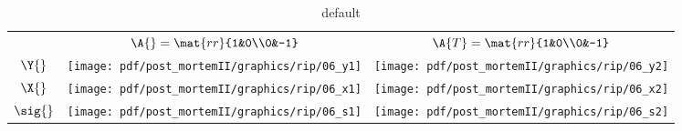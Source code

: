 \begin{table}[htdp]
\begin{center}
\begin{tabular}{ccc}
 & $\A{}=\mat{rr}{1&0\\0&-1}$ & $\A{T} = \mat{rr}{1&0\\0&-1} $ \\[35pt]
 $\Y{}$   & \qquad \texttt{[image: pdf/post\_mortemII/graphics/rip/06\_y1]} 
          & \qquad \texttt{[image: pdf/post\_mortemII/graphics/rip/06\_y2]} \\[15pt]
 $\X{}$   & \qquad \texttt{[image: pdf/post\_mortemII/graphics/rip/06\_x1]}
          & \qquad \texttt{[image: pdf/post\_mortemII/graphics/rip/06\_x2]} \\[20pt]
 $\sig{}$ & \quad  \texttt{[image: pdf/post\_mortemII/graphics/rip/06\_s1]}
          & \quad  \texttt{[image: pdf/post\_mortemII/graphics/rip/06\_s2]} \\[20pt]
\end{tabular}
\end{center}
\label{tab:pmII:visualsi}
\caption{default}
\end{table}%
\clearpage

\endinput